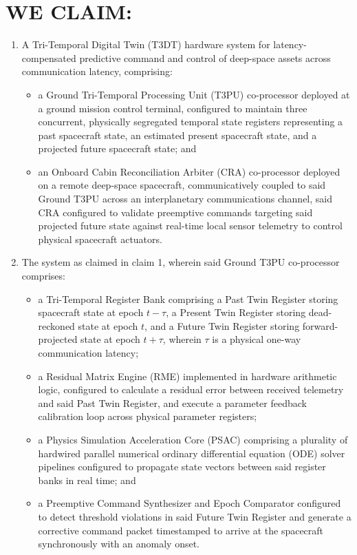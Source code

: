 \documentclass[12pt,a4paper]{article}
\begin{document}
\newpage

\section*{WE CLAIM:}

\begin{enumerate}
    \item A Tri-Temporal Digital Twin (T3DT) hardware system for latency-compensated predictive command and control of deep-space assets across communication latency, comprising:
    \begin{itemize}
        \item a Ground Tri-Temporal Processing Unit (T3PU) co-processor deployed at a ground mission control terminal, configured to maintain three concurrent, physically segregated temporal state registers representing a past spacecraft state, an estimated present spacecraft state, and a projected future spacecraft state; and
        \item an Onboard Cabin Reconciliation Arbiter (CRA) co-processor deployed on a remote deep-space spacecraft, communicatively coupled to said Ground T3PU across an interplanetary communications channel, said CRA configured to validate preemptive commands targeting said projected future state against real-time local sensor telemetry to control physical spacecraft actuators.
    \end{itemize}

    \item The system as claimed in claim 1, wherein said Ground T3PU co-processor comprises:
    \begin{itemize}
        \item a Tri-Temporal Register Bank comprising a Past Twin Register storing spacecraft state at epoch $t-\tau$, a Present Twin Register storing dead-reckoned state at epoch $t$, and a Future Twin Register storing forward-projected state at epoch $t+\tau$, wherein $\tau$ is a physical one-way communication latency;
        \item a Residual Matrix Engine (RME) implemented in hardware arithmetic logic, configured to calculate a residual error between received telemetry and said Past Twin Register, and execute a parameter feedback calibration loop across physical parameter registers;
        \item a Physics Simulation Acceleration Core (PSAC) comprising a plurality of hardwired parallel numerical ordinary differential equation (ODE) solver pipelines configured to propagate state vectors between said register banks in real time; and
        \item a Preemptive Command Synthesizer and Epoch Comparator configured to detect threshold violations in said Future Twin Register and generate a corrective command packet timestamped to arrive at the spacecraft synchronously with an anomaly onset.
    \end{itemize}


\end{enumerate}
\end{document}
